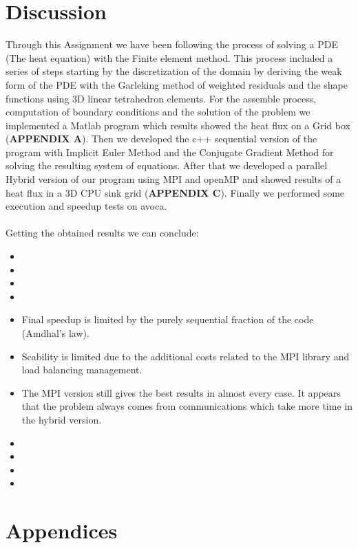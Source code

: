 \documentclass[12pt]{article}
\begin{document}
	
	\section{Discussion}

Through this Assignment we have been following the process of solving a PDE (The heat equation) with the Finite element method. This process included a series of steps starting by the discretization of the domain by deriving the weak form of the PDE with the Garleking method of weighted residuals and the shape functions using 3D linear tetrahedron elements. For the assemble process, computation of boundary conditions and the solution of the problem we implemented a Matlab program which results showed the heat flux on a Grid box (\textbf{APPENDIX A}). Then we developed the c++ sequential version of the program with Implicit Euler Method and the Conjugate Gradient Method for solving the resulting system of equations. After that we developed a parallel Hybrid version of our program using MPI and openMP and showed results of a heat flux in a 3D CPU sink grid (\textbf{APPENDIX C}). Finally we performed some execution and speedup tests on avoca.
\\\\
Getting the obtained results we can conclude:

\begin{itemize}
  \item 
  \item
  \item
  \item  
  \item Final speedup is limited by the purely sequential fraction of the code (Amdhal’s law).
  \item Scability is limited due to the additional costs related to the MPI library and load
balancing management.
  \item The MPI version still gives the best results in almost every case.
It appears that the problem always comes from communications which take more
time in the hybrid version.
  \item
  \item
  \item
  \item
\end{itemize}

	\section{Appendices}
	
\end{document}
